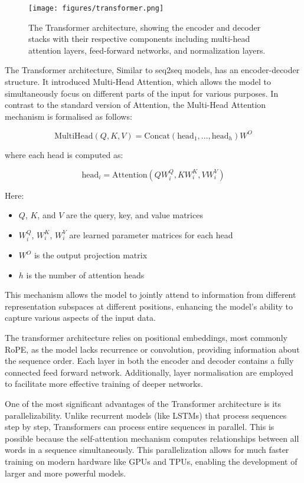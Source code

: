 \documentclass[a4paper, oneside]{discothesis}
\begin{document}
\begin{figure}[h]
    \centering
    \texttt{[image: figures/transformer.png]}
    \caption{The Transformer architecture, showing the encoder and decoder stacks with their respective components including multi-head attention layers, feed-forward networks, and normalization layers.}
    \label{fig:transformer_architecture}
\end{figure}


The Transformer architecture, Similar to seq2seq models, has an encoder-decoder structure. It introduced Multi-Head Attention, which allows the model to simultaneously focus on different parts of the input for various purposes. In contrast to the standard version of Attention, the Multi-Head Attention mechanism is formalised as follows:

\begin{equation}
\text{MultiHead}(Q, K, V) = \text{Concat}(\text{head}_1, ..., \text{head}_h)W^O
\end{equation}

where each head is computed as:

\begin{equation}
\text{head}_i = \text{Attention}(QW_i^Q, KW_i^K, VW_i^V)
\end{equation}

Here:
\begin{itemize}
    \item $Q$, $K$, and $V$ are the query, key, and value matrices
    \item $W_i^Q$, $W_i^K$, $W_i^V$ are learned parameter matrices for each head
    \item $W^O$ is the output projection matrix
    \item $h$ is the number of attention heads
\end{itemize}

This mechanism allows the model to jointly attend to information from different representation subspaces at different positions, enhancing the model's ability to capture various aspects of the input data.

The transformer architecture relies on positional embeddings, most commonly RoPE, as the model lacks recurrence or convolution, providing information about the sequence order. Each layer in both the encoder and decoder contains a fully connected feed forward network. Additionally, layer normalisation are employed to facilitate more effective training of deeper networks.

One of the most significant advantages of the Transformer architecture is its parallelizability. Unlike recurrent models (like LSTMs) that process sequences step by step, Transformers can process entire sequences in parallel. This is possible because the self-attention mechanism computes relationships between all words in a sequence simultaneously. This parallelization allows for much faster training on modern hardware like GPUs and TPUs, enabling the development of larger and more powerful models.
\end{document}
